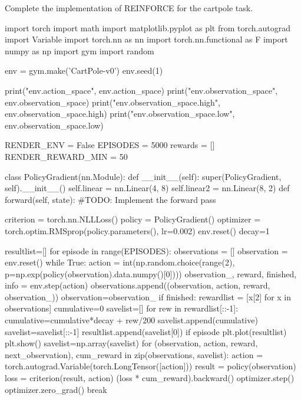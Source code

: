 \begin{exercise}
Complete the implementation of REINFORCE for the cartpole task.
\begin{python}
import torch
import math
import matplotlib.pyplot as plt
from torch.autograd import Variable
import torch.nn as nn
import torch.nn.functional as F
import numpy as np
import gym
import random

env = gym.make('CartPole-v0')
env.seed(1)

print("env.action_space", env.action_space)
print("env.observation_space", env.observation_space)
print("env.observation_space.high", env.observation_space.high)
print("env.observation_space.low", env.observation_space.low)


RENDER_ENV = False
EPISODES = 5000
rewards = []
RENDER_REWARD_MIN = 50

class PolicyGradient(nn.Module):
    def __init__(self):
        super(PolicyGradient, self).__init__()
        self.linear = nn.Linear(4, 8)
        self.linear2 = nn.Linear(8, 2)
    def forward(self, state):
        #TODO: Implement the forward pass
    
criterion = torch.nn.NLLLoss()
policy = PolicyGradient()
optimizer = torch.optim.RMSprop(policy.parameters(), lr=0.002)
env.reset()
decay=1

resultlist=[]
for episode in range(EPISODES):
    observations = []
    observation = env.reset()
    while True:
        action = int(np.random.choice(range(2), p=np.exp(policy(observation).data.numpy()[0])))
        observation_, reward, finished, info = env.step(action)
        observations.append((observation, action, reward, observation_))
        observation=observation_
        if finished:
            rewardlist = [x[2] for x in observations]
            cumulative=0
            savelist=[]
            for rew in rewardlist[::-1]:
                cumulative=cumulative*decay + rew/200
                savelist.append(cumulative)
            savelist=savelist[::-1]
            resultlist.append(savelist[0])
            if episode%
                plt.plot(resultlist)
                plt.show()
            savelist=np.array(savelist)
            for (observation, action, reward, next_observation), cum_reward in zip(observations, savelist):
                action = torch.autograd.Variable(torch.LongTensor([action]))
                result = policy(observation)
                loss = criterion(result, action)
                (loss * cum_reward).backward()
                optimizer.step()
                optimizer.zero_grad()
            break
\end{python}
\end{exercise}


